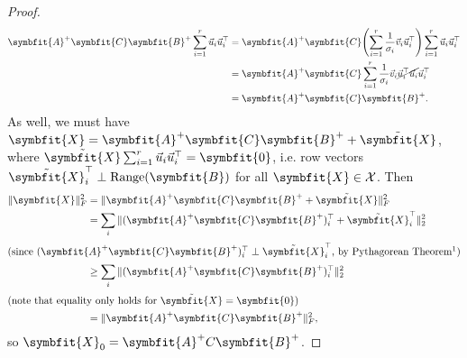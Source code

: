 \documentclass{article}
\theoremstyle{definition}
\newcommand{\mat}[1]{\symbfit{#1}}
\DeclareMathOperator{\range}{Range}
\begin{document}
\begin{enumerate}[leftmargin=\labelsep]
\begin{proof}
\begin{align*}
			      \mat{A}^+\mat{C}\mat{B}^+\sum_{i = 1}^r \vec{u}_i\vec{u}_i^\top & = \mat{A}^+\mat{C}\qty(\sum_{i = 1}^r \frac{1}{\sigma_i}\vec{v}_i\vec{u}_i^\top)\sum_{i = 1}^r \vec{u}_i\vec{u}_i^\top \\
			                                                                      & = \mat{A}^+\mat{C}\sum_{i = 1}^r \frac{1}{\sigma_i}\vec{v}_i\cancel{\vec{u}_i^\top\vec{u}_i}\vec{u}_i^\top             \\
			                                                                      & = \mat{A}^+\mat{C}\mat{B}^+.
		      \end{align*}
		      As well, we must have \(\mat{X} = \mat{A}^+\mat{C}\mat{B}^+ + \tilde{\mat{X}}\), where \(\tilde{\mat{X}} \sum_{i = 1}^r \vec{u}_i\vec{u}_i^\top = \mat{0}\), i.e. row vectors \(\tilde{\mat{X}}_i^\top \perp \range(\mat{B})\) for all \(\mat{X} \in \mathcal{X}\). Then
		      \begin{align*}
			      \|\mat{X}\|_F^2 & =  \|\mat{A}^+\mat{C}\mat{B}^+ + \tilde{\mat{X}}\|_F^2                         \\
			                      & = \sum_{i} \|(\mat{A}^+\mat{C}\mat{B}^+)_i^\top + \tilde{\mat{X}}_i^\top\|_2^2 \\
			      \shortintertext{(since \((\mat{A}^+\mat{C}\mat{B}^+)_i^\top \perp \tilde{\mat{X}}_i^\top\), by Pythagorean Theorem\footnotemark)}
			                      & \geq \sum_{i} \|(\mat{A}^+\mat{C}\mat{B}^+)_i^\top\|_2^2                       \\
			      \shortintertext{(note that equality only holds for \(\tilde{\mat{X}} = \mat{0}\))}
			                      & = \|\mat{A}^+\mat{C}\mat{B}^+\|_F^2,
		      \end{align*}
		      so \(\mat{X}_0 = \mat{A}^+C\mat{B}^+\).
	      \end{proof}


\end{enumerate}
\end{document}
